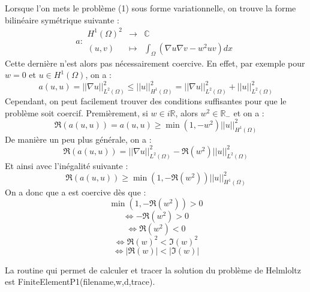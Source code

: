 \documentclass[a4paper,12pt]{article}
\begin{document}
Lorsque l'on mets le problème (1) sous forme variationnelle, on trouve la forme bilinéaire symétrique suivante :
\[a:\begin{array}{ccccc}
H^{1}(\Omega)^{2} & \to & \mathbb{C}\\
(u,v) & \mapsto & \int_{\Omega}{(\nabla u \nabla v - w^{2}uv)dx}
\end{array}
\]
Cette dernière n'est alors pas nécessairement coercive. En effet, par exemple pour $w=0$ et $u \in H^{1}(\Omega)$, on a :
\[a(u,u) = ||\nabla u||^{2}_{L^{2}(\Omega)} \leq ||u||^{2}_{H^{1}(\Omega)} = ||\nabla u||^{2}_{L^{2}(\Omega)} + ||u||^{2}_{L^{2}(\Omega)}
\]
Cependant, on peut facilement trouver des conditions suffisantes pour que le problème soit coercif.
Premièrement, si $w \in i\mathbb{R}$, alors $w^{2} \in \mathbb{R}_{-}$ et on a :
\[\Re(a(u,u)) = a(u,u) \geq \min(1,-w^{2})||u||^{2}_{H^{1}(\Omega)} \]
De manière un peu plus générale, on a :
\[\Re(a(u,u)) = ||\nabla u||^{2}_{L^{2}(\Omega)} - \Re(w^{2})||u||^{2}_{L^{2}(\Omega)}
\]
Et ainsi avec l'inégalité suivante :
\[\Re(a(u,u)) \geq \min(1,- \Re(w^{2}))||u||^{2}_{H^{1}(\Omega)}
\]
On a donc que a est coercive dès que :
\[\min(1,- \Re(w^{2})) > 0 \]
\[\iff - \Re(w^{2}) > 0 \]
\[\iff \Re(w^{2}) < 0\]
\[\iff \Re(w)^{2} < \Im(w)^{2} \]
\[\iff |\Re(w)| < |\Im(w)| \]

La routine qui permet de calculer et tracer la solution du problème de Helmloltz est FiniteElementP1(filename,w,d,trace).\\
\end{document}
